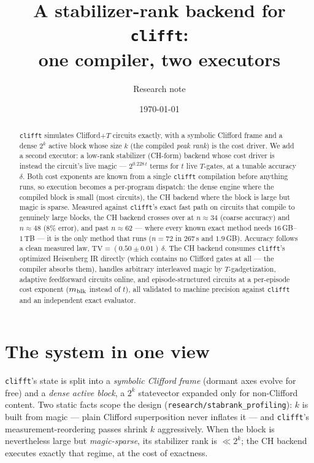 \documentclass[11pt]{article}
\title{A stabilizer-rank backend for \texttt{clifft}:\\
       one compiler, two executors}
\author{Research note}
\date{\today}
\begin{document}
\maketitle

\begin{abstract}
\texttt{clifft} simulates Clifford$+T$ circuits exactly, with a symbolic
Clifford frame and a dense $2^k$ active block whose size $k$ (the compiled
\emph{peak rank}) is the cost driver. We add a second executor: a low-rank
stabilizer (CH-form) backend whose cost driver is instead the circuit's live
magic --- $2^{0.228\,t}$ terms for $t$ live $T$-gates, at a tunable accuracy
$\delta$. Both cost exponents are known from a single \texttt{clifft}
compilation before anything runs, so execution becomes a per-program
dispatch: the dense engine where the compiled block is small (most circuits),
the CH backend where the block is large but magic is sparse. Measured against
\texttt{clifft}'s exact fast path on circuits that compile to genuinely large
blocks, the CH backend crosses over at $n\!\approx\!34$ (coarse accuracy) and
$n\!\approx\!48$ ($8\%$ error), and past $n\!\approx\!62$ --- where every
known exact method needs $16$\,GB--$1$\,TB --- it is the only method that
runs ($n{=}72$ in $267$\,s and $1.9$\,GB). Accuracy follows a clean measured
law, $\mathrm{TV}=(0.50\pm0.01)\,\delta$. The CH backend consumes
\texttt{clifft}'s optimized Heisenberg IR directly (which contains no
Clifford gates at all --- the compiler absorbs them), handles arbitrary
interleaved magic by $T$-gadgetization, adaptive feedforward circuits online,
and episode-structured circuits at a per-episode cost exponent
($m_{\rm blk}$ instead of $t$), all validated to machine precision against
\texttt{clifft} and an independent exact evaluator.
\end{abstract}

\section{The system in one view}\label{sec:arch}

\texttt{clifft}'s state is split into a \emph{symbolic Clifford frame}
(dormant axes evolve for free) and a \emph{dense active block}, a $2^k$
statevector expanded only for non-Clifford content. Two static facts scope
the design (\texttt{research/stabrank\_profiling}): $k$ is built from magic
--- plain Clifford superposition never inflates it --- and \texttt{clifft}'s
measurement-reordering passes shrink $k$ aggressively. When the block is
nevertheless large but \emph{magic-sparse}, its stabilizer rank is
$\ll 2^k$; the CH backend executes exactly that regime, at the cost of
exactness.
\end{document}
